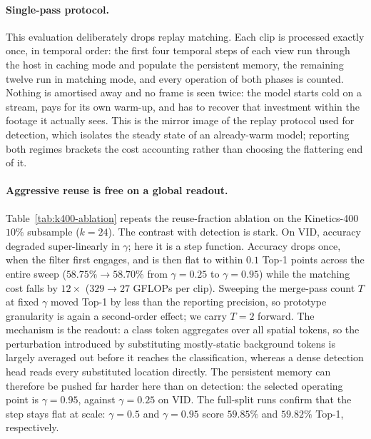 \paragraph{Single-pass protocol.}
This evaluation deliberately drops replay matching. Each clip is
processed exactly once, in temporal order: the first four temporal steps
of each view run through the host in caching mode and populate the
persistent memory, the remaining twelve run in matching mode, and every
operation of both phases is counted. Nothing is amortised away and no
frame is seen twice: the model starts cold on a stream, pays for its own
warm-up, and has to recover that investment within the footage it
actually sees. This is the mirror image of the replay protocol used for
detection, which isolates the steady state of an already-warm model;
reporting both regimes brackets the cost accounting rather than choosing
the flattering end of it.

\paragraph{Aggressive reuse is free on a global readout.}
Table~\ref{tab:k400-ablation} repeats the reuse-fraction ablation on the
Kinetics-400 $10\%$ subsample ($k = 24$). The contrast with detection is
stark. On VID, accuracy degraded super-linearly in $\gamma$; here it is
a step function. Accuracy drops once, when the filter first engages, and
is then flat to within $0.1$ Top-1 points across the entire sweep
($58.75\% \rightarrow 58.70\%$ from $\gamma = 0.25$ to $\gamma = 0.95$)
while the matching cost falls by $12\times$ ($329 \rightarrow 27$ GFLOPs
per clip). Sweeping the merge-pass count $T$ at fixed $\gamma$ moved
Top-1 by less than the reporting precision, so prototype granularity is
again a second-order effect; we carry $T = 2$
forward. The mechanism is the readout: a class token aggregates over all
spatial tokens, so the perturbation introduced by substituting
mostly-static background tokens is largely averaged out before it
reaches the classification, whereas a dense detection head reads every
substituted location directly. The persistent memory can therefore be
pushed far harder here than on detection: the selected operating point
is $\gamma = 0.95$, against $\gamma = 0.25$ on VID. The full-split runs
confirm that the step stays flat at scale: $\gamma = 0.5$ and
$\gamma = 0.95$ score $59.85\%$ and $59.82\%$ Top-1, respectively.

